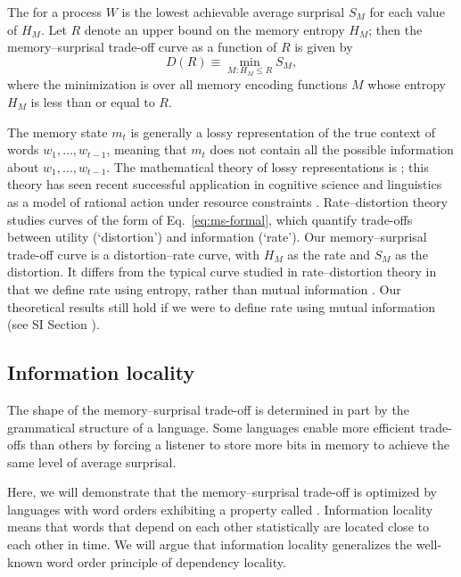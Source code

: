 \begin{definition}
The  for a process $W$ is the lowest achievable average surprisal $S_M$ for each value of $H_M$. Let $R$ denote an upper bound on the memory entropy $H_M$; then the memory--surprisal trade-off curve as a function of $R$ is given by
\begin{equation}
    \label{eq:ms-formal}
    D(R) \equiv \min_{M : H_M \le R} S_M,
\end{equation}
where the minimization is over all memory encoding functions $M$ whose entropy $H_M$ is less than or equal to $R$.
\end{definition}

The memory state $m_t$ is generally a lossy representation of the true context of words $w_1, \dots, w_{t-1}$, meaning that $m_t$ does not contain all the possible information about $w_1, \dots, w_{t-1}$. The mathematical theory of lossy representations is  \citep[for an overview and key results, see][pp. 301--347]{cover2006elements}; this theory has seen recent successful application in cognitive science and linguistics as a model of rational action under resource constraints \citep{sims2018efficient,gershman,zaslavsky2018efficient}. Rate--distortion theory studies curves of the form of Eq.~\ref{eq:ms-formal}, which quantify trade-offs between utility (`distortion') and information (`rate'). Our memory--surprisal trade-off curve is a distortion--rate curve, with $H_M$ as the rate and $S_M$ as the distortion. It differs from the typical curve studied in rate--distortion theory in that we define rate using entropy, rather than mutual information \citep[see][for a discussion of some of the consequences of this formulation]{strouse-deterministic-2017}. 
Our theoretical results still hold if we were to define rate using mutual information (see SI Section \REF).


\subsection{Information locality}
\label{sec:infoloc}

The shape of the memory--surprisal trade-off is determined in part by the grammatical structure of a language.
Some languages enable more efficient trade-offs than others by forcing a listener to store more bits in memory to achieve the same level of average surprisal.

Here, we will demonstrate that the memory--surprisal trade-off is optimized by languages with word orders exhibiting a property called . Information locality means that words that depend on each other statistically are located close to each other in time. We will argue that information locality generalizes the well-known word order principle of dependency locality.

